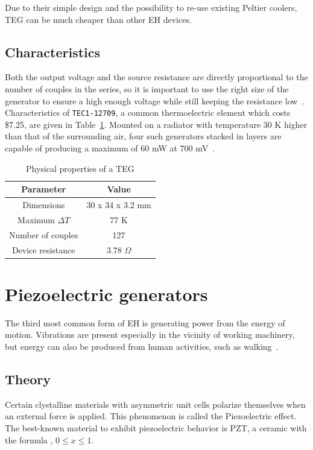 \documentclass[a4paper,10pt]{article}
\begin{document}
Due to their simple design and the possibility to re-use existing Peltier coolers, \ac{TEG} can be much cheaper than other \ac{EH} devices. 

\subsection{Characteristics}

Both the output voltage and the source resistance are directly proportional to the number of couples in the series, so it is important to use the right size of the generator to ensure a high enough voltage while still keeping the resistance low~\cite{Salerno10}. Characteristics of \texttt{TEC1-12709}, a common thermoelectric element which costs \$7.25, are given in Table~\ref{tab:teg-radiator}. Mounted on a radiator with temperature 30 K higher than that of the surrounding air, four such generators stacked in layers are capable of producing a maximum of 60 mW at 700 mV~\cite{teg-wsn-ieee}. 

\begin{table}[h]
  \centering
  \begin{tabular}{|c|c|}
\hline
    Parameter & Value \\
\hline
Dimensions & 30 x 34 x 3.2 mm \\
Maximum $\Delta T$ & 77 K \\
Number of couples & 127 \\
Device resistance & 3.78 $\Omega$ \\
\hline
  \end{tabular}
\caption{Physical properties of a \ac{TEG}}
\label{tab:teg-radiator}
\end{table}

\section{Piezoelectric generators}

The third most common form of \ac{EH} is generating power from the energy of motion. Vibrations are present especially in the vicinity of working machinery, but energy can also be produced from human activities, such as walking~\cite{piezo-shoe-ieee}. 

\subsection{Theory}

Certain clystalline materials with asymmetric unit cells polarize themselves when an external force is applied. This phenomenon is called the Piezoelectric effect. The best-known material to exhibit piezoelectric behavior is \ac{PZT}, a ceramic with the formula , $0\leq x \leq 1$.
\end{document}
